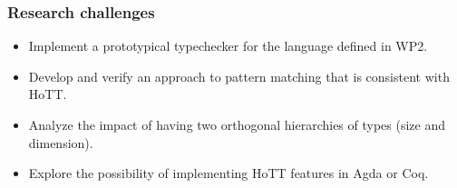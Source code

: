 \documentclass[twocolumn,a4paper,11pt]{article}
\begin{document}






\subsubsection*{Research challenges}

\begin{itemize}

\item Implement a prototypical typechecker for the language defined in
  WP2. 

\item Develop and verify an approach to pattern matching that is
  consistent with HoTT.

\item Analyze the impact of having two orthogonal hierarchies of types
  (size and dimension).

\item Explore the possibility of implementing HoTT features in Agda or
  Coq.
  
\end{itemize}
\end{document}

